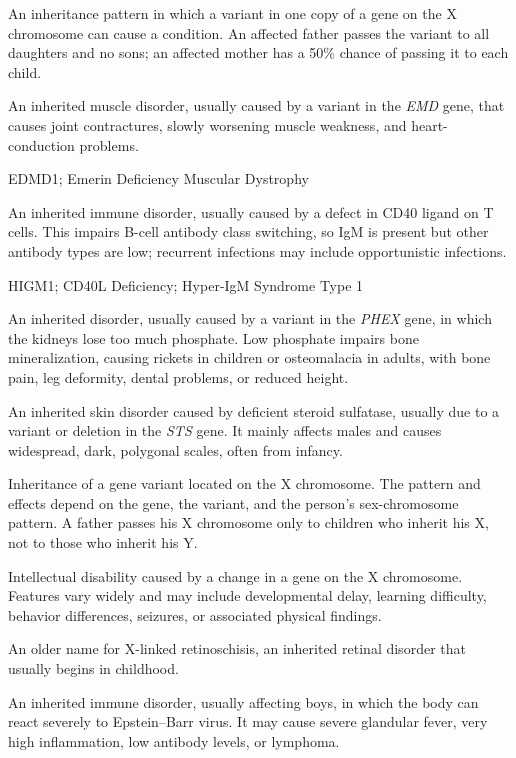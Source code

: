  An inheritance pattern in which a variant in one copy of a gene on the X chromosome can cause a condition. An affected father passes the variant to all daughters and no sons; an affected mother has a 50\% chance of passing it to each child.

 An inherited muscle disorder, usually caused by a variant in the \textit{EMD} gene, that causes joint contractures, slowly worsening muscle weakness, and heart-conduction problems.

\synonyms
EDMD1; Emerin Deficiency Muscular Dystrophy

 An inherited immune disorder, usually caused by a defect in CD40 ligand on T cells. This impairs B-cell antibody class switching, so IgM is present but other antibody types are low; recurrent infections may include opportunistic infections.

\synonyms
HIGM1; CD40L Deficiency; Hyper-IgM Syndrome Type 1

 An inherited disorder, usually caused by a variant in the \textit{PHEX} gene, in which the kidneys lose too much phosphate. Low phosphate impairs bone mineralization, causing rickets in children or osteomalacia in adults, with bone pain, leg deformity, dental problems, or reduced height.

 An inherited skin disorder caused by deficient steroid sulfatase, usually due to a variant or deletion in the \textit{STS} gene. It mainly affects males and causes widespread, dark, polygonal scales, often from infancy.

 Inheritance of a gene variant located on the X chromosome. The pattern and effects depend on the gene, the variant, and the person's sex-chromosome pattern. A father passes his X chromosome only to children who inherit his X, not to those who inherit his Y.

 Intellectual disability caused by a change in a gene on the X chromosome. Features vary widely and may include developmental delay, learning difficulty, behavior differences, seizures, or associated physical findings.

 An older name for X-linked retinoschisis, an inherited retinal disorder that usually begins in childhood.

 An inherited immune disorder, usually affecting boys, in which the body can react severely to Epstein--Barr virus. It may cause severe glandular fever, very high inflammation, low antibody levels, or lymphoma.


